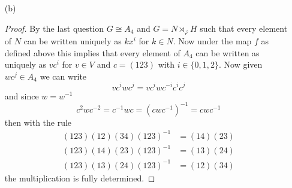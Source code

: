 \documentclass[12pt]{article}
\begin{document}
\begin{enumerate}
\begin{proof}
        Now suppose we fix an homomorphism $\varphi: H \to \operatorname{Aut}(N)$,
        the three non-identity elements of $N$ are indistinguishable so they can be permuted freely by an
        automorphism. Thus $\operatorname{Aut}(N) \cong S_3$. Now enumerate $N$ as $e, a, b, c$.
        $\varphi$ is determined by its image on $x$ the generator of $H$. Now $\varphi$
        is non trivial and since $|x| = 3$ this implies that $|\varphi(x)| = 3$. I.e. it is a 3-cycle.
        Without loss of generality (up to relabeling of $N$)  $\varphi_x(a) = b$,
        $\varphi_x(b) = c$ and $\varphi_x(c) = a$.

        Now we define a homomorphism $f: G \to A_4$ specified by
        \[ x \mapsto (123) \]
        and
        \[ N = \{ e, a, b, c \} \mapsto \{ e, (12)(34), (14)(23), (13)(24) \} \]
        in the obvious way. It is clear that
        \begin{align*}
            (123)(12)(34)(123)^{-1} &= (14)(23) \\
            (123)(14)(23)(123)^{-1} &= (13)(24) \\
            (123)(13)(24)(123)^{-1} &= (12)(34)
        \end{align*}
        thus
        \[ f\varphi_x(k) = (123)f(k)(123)^{-1} \]
        for any $k \in N$ and therefore for any $k, \ell \in N$:
        \begin{align*}
            f(kx^{i}\ell x^j) &= f(k\varphi_{x^i}(\ell)x^{i+j}) \\
            &= f(k)(123)^{i}f(\ell)(123)^{-i}(123)^{i+j} \\
            &= f(k)(123)^{i}f(\ell)(123)^{j} \\
            &= f(kx^{i})f(\ell x^j) \\
        \end{align*}
        hence $f$ is a homomorphism. Additionally, it is clearly injective.
        Thus $G \cong A_4$.
    \end{proof}

    \item[(b)]
    \begin{proof}
        By the last question $G \cong A_4$ and $G = N \rtimes_\varphi H$ such that
        every element of $N$ can be written uniquely as $kx^i$ for $k \in N$. Now under the map $f$
        as defined above this implies that every element of $A_4$ can be written as uniquely as $vc^i$
        for $v \in V$ and $c = (123)$ with $i \in \{ 0, 1, 2 \}$. Now given $wc^j \in A_4$ we can write
        \[ vc^iwc^j = vc^iwc^{-i}c^ic^j \]
        and since $w = w^{-1}$
        \[ c^2wc^{-2} = c^{-1}wc = (cwc^{-1})^{-1} = cwc^{-1} \]
        then with the rule
                \begin{align*}
            (123)(12)(34)(123)^{-1} &= (14)(23) \\
            (123)(14)(23)(123)^{-1} &= (13)(24) \\
            (123)(13)(24)(123)^{-1} &= (12)(34)
        \end{align*}
        the multiplication is fully determined.


\end{proof}
\end{enumerate}
\end{document}
